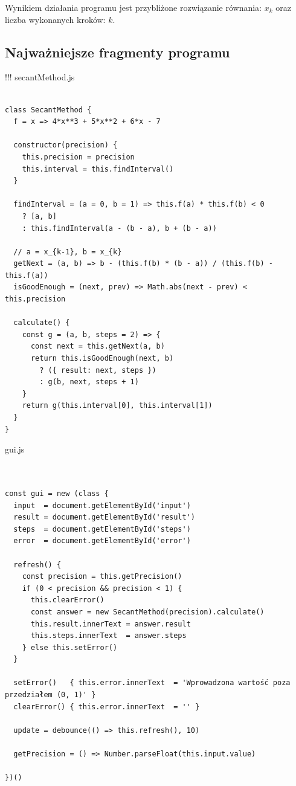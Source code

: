 \documentclass[12pt]{article}
\begin{document}
Wynikiem działania programu jest przybliżone rozwiązanie równania: $x_k$ oraz liczba wykonanych kroków: $k$.
\newpage
\subsection{Najważniejsze fragmenty programu}
!!!
secantMethod.js
\begin{verbatim}

class SecantMethod {
  f = x => 4*x**3 + 5*x**2 + 6*x - 7

  constructor(precision) {
    this.precision = precision
    this.interval = this.findInterval()
  }

  findInterval = (a = 0, b = 1) => this.f(a) * this.f(b) < 0
    ? [a, b]
    : this.findInterval(a - (b - a), b + (b - a))

  // a = x_{k-1}, b = x_{k}
  getNext = (a, b) => b - (this.f(b) * (b - a)) / (this.f(b) - this.f(a))
  isGoodEnough = (next, prev) => Math.abs(next - prev) < this.precision

  calculate() {
    const g = (a, b, steps = 2) => {
      const next = this.getNext(a, b)
      return this.isGoodEnough(next, b)
        ? ({ result: next, steps })
        : g(b, next, steps + 1)
    }
    return g(this.interval[0], this.interval[1])
  }
}

\end{verbatim}
\newpage
gui.js
\begin{verbatim}


const gui = new (class {
  input  = document.getElementById('input')
  result = document.getElementById('result')
  steps  = document.getElementById('steps')
  error  = document.getElementById('error')

  refresh() {
    const precision = this.getPrecision()
    if (0 < precision && precision < 1) {
      this.clearError()
      const answer = new SecantMethod(precision).calculate()
      this.result.innerText = answer.result
      this.steps.innerText  = answer.steps
    } else this.setError()
  }

  setError()   { this.error.innerText  = 'Wprowadzona wartość poza przedziałem (0, 1)' }
  clearError() { this.error.innerText  = '' }

  update = debounce(() => this.refresh(), 10)

  getPrecision = () => Number.parseFloat(this.input.value)

})()
\end{verbatim}
\newpage
\end{document}

